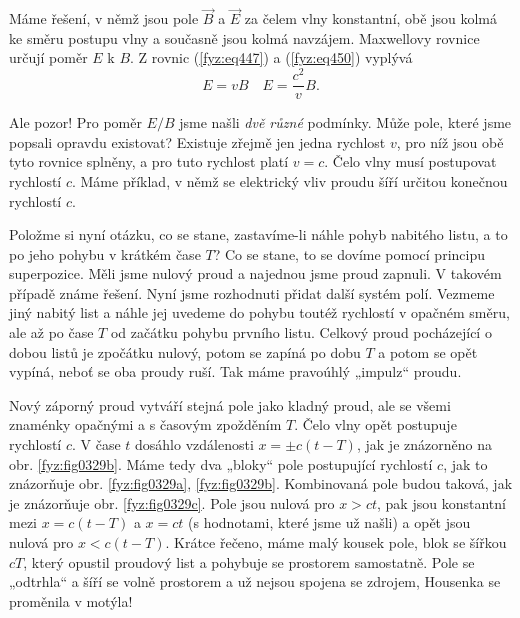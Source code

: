   Máme řešení, v němž jsou pole \(\vec{B}\) a \(\vec{E}\) za čelem vlny konstantní, obě jsou kolmá 
  ke směru postupu vlny a současně jsou kolmá navzájem. Maxwellovy rovnice určují poměr \(E\) k 
  \(B\). Z rovnic (\ref{fyz:eq447}) a (\ref{fyz:eq450}) vyplývá
  \begin{equation*}
    E = vB \quad E = \frac{c^2}{v}B.
  \end{equation*}
  
  Ale pozor! Pro poměr \(E/B\) jsme našli \emph{dvě různé} podmínky. Může pole, které jsme popsali 
  opravdu existovat? Existuje zřejmě jen jedna rychlost \(v\), pro níž jsou obě tyto rovnice 
  splněny, a pro tuto rychlost platí \(v = c\). Čelo vlny musí postupovat rychlostí \(c\). Máme 
  příklad, v němž se elektrický vliv proudu šíří určitou konečnou rychlostí \(c\). 
  
  Položme si nyní otázku, co se stane, zastavíme-li náhle pohyb nabitého listu, a to po jeho pohybu 
  v krátkém čase \(T\)? Co se stane, to se dovíme pomocí principu superpozice. Měli jsme nulový 
  proud a najednou jsme proud zapnuli. V takovém případě známe řešení. Nyní jsme rozhodnuti přidat 
  další systém polí. Vezmeme jiný nabitý list a náhle jej uvedeme do pohybu toutéž rychlostí v 
  opačném směru, ale až po čase \(T\) od začátku pohybu prvního listu. Celkový proud pocházející o 
  dobou listů je zpočátku nulový, potom se zapíná po dobu \(T\) a potom se opět vypíná, neboť se 
  oba proudy ruší. Tak máme pravoúhlý „impulz“ proudu. 
  
  Nový záporný proud vytváří stejná pole jako kladný proud, ale se všemi znaménky opačnými a s 
  časovým zpožděním \(T\). Čelo vlny opět postupuje rychlostí \(c\). V čase \(t\) dosáhlo 
  vzdálenosti \(x=\pm c(t-T)\), jak je znázorněno na obr. \ref{fyz:fig0329b}. Máme tedy dva „bloky“ 
  pole postupující rychlostí \(c\), jak to znázorňuje obr. \ref{fyz:fig0329a}, \ref{fyz:fig0329b}. 
  Kombinovaná pole budou taková, jak je znázorňuje obr. \ref{fyz:fig0329c}. Pole jsou nulová pro 
  \(x>ct\), pak jsou konstantní mezi \(x = c(t - T)\) a \(x = ct\) (s hodnotami, které jsme už 
  našli) a opět jsou nulová pro \(x<c(t-T)\). Krátce řečeno, máme malý kousek pole, blok se šířkou 
  \(cT\), který opustil proudový list a pohybuje se prostorem samostatně. Pole se „odtrhla“ a šíří 
  se volně prostorem a už nejsou spojena se zdrojem, Housenka se proměnila v motýla! 
  
